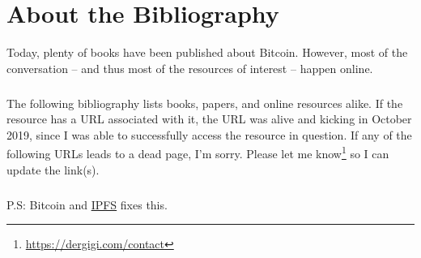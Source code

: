 \chapter*{About the Bibliography}

Today, plenty of books have been published about Bitcoin. However, most of the
conversation -- and thus most of the resources of interest -- happen online.

\paragraph{}
The following bibliography lists books, papers, and online resources alike. If
the resource has a URL associated with it, the URL was alive and kicking in
October 2019, since I was able to successfully access the resource in question.
If any of the following URLs leads to a dead page, I'm sorry. Please let me
know\footnote{\url{https://dergigi.com/contact}} so I can update the link(s).

\paragraph{}
P.S: Bitcoin and \href{https://ipfs.io/}{IPFS} fixes this.
